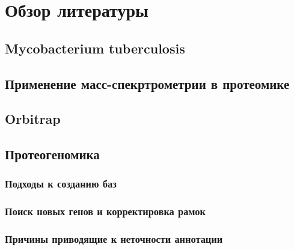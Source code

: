 \section{Обзор литературы}

\subsection{Mycobacterium tuberculosis}

\subsection{Применение масс-спекртрометрии в протеомике}

\subsection{Orbitrap}

\subsection{Протеогеномика}
\subsubsection{Подходы к созданию баз}
\subsubsection{Поиск новых генов и корректировка рамок}
\subsubsection{Причины приводящие к неточности аннотации}

\newpage
